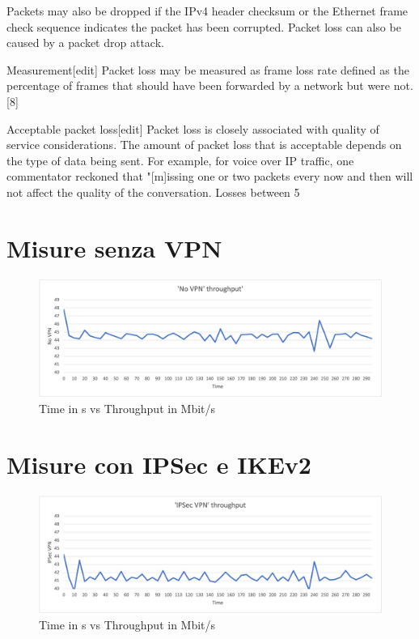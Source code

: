 Packets may also be dropped if the IPv4 header checksum or the Ethernet frame check sequence indicates the packet has been corrupted. Packet loss can also be caused by a packet drop attack.

Measurement[edit]
Packet loss may be measured as frame loss rate defined as the percentage of frames that should have been forwarded by a network but were not.[8]

Acceptable packet loss[edit]
Packet loss is closely associated with quality of service considerations. The amount of packet loss that is acceptable depends on the type of data being sent. For example, for voice over IP traffic, one commentator reckoned that "[m]issing one or two packets every now and then will not affect the quality of the conversation. Losses between 5%

\section{Misure senza VPN}
\begin{figure}[ht]
    \centering
    \includegraphics[width=12cm]{figure/vpn_thr.png-1.png}
    \caption{Time in s vs Throughput in Mbit/s}
\end{figure}


\section{Misure con IPSec e IKEv2}
\begin{figure}[ht]
    \centering
    \includegraphics[width=12cm]{figure/vpn_thr.png-2.png}
    \caption{Time in s vs Throughput in Mbit/s}
\end{figure}


